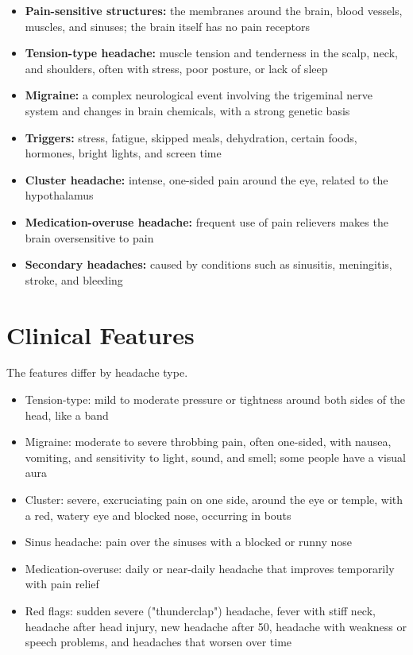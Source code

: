 \begin{itemize}
    \item \textbf{Pain-sensitive structures:} the membranes around the brain, blood vessels, muscles, and sinuses; the brain itself has no pain receptors
    \item \textbf{Tension-type headache:} muscle tension and tenderness in the scalp, neck, and shoulders, often with stress, poor posture, or lack of sleep
    \item \textbf{Migraine:} a complex neurological event involving the trigeminal nerve system and changes in brain chemicals, with a strong genetic basis
    \item \textbf{Triggers:} stress, fatigue, skipped meals, dehydration, certain foods, hormones, bright lights, and screen time
    \item \textbf{Cluster headache:} intense, one-sided pain around the eye, related to the hypothalamus
    \item \textbf{Medication-overuse headache:} frequent use of pain relievers makes the brain oversensitive to pain
    \item \textbf{Secondary headaches:} caused by conditions such as sinusitis, meningitis, stroke, and bleeding
\end{itemize}

\section*{Clinical Features}
The features differ by headache type.

\begin{itemize}
    \item Tension-type: mild to moderate pressure or tightness around both sides of the head, like a band
    \item Migraine: moderate to severe throbbing pain, often one-sided, with nausea, vomiting, and sensitivity to light, sound, and smell; some people have a visual aura
    \item Cluster: severe, excruciating pain on one side, around the eye or temple, with a red, watery eye and blocked nose, occurring in bouts
    \item Sinus headache: pain over the sinuses with a blocked or runny nose
    \item Medication-overuse: daily or near-daily headache that improves temporarily with pain relief
    \item Red flags: sudden severe ("thunderclap") headache, fever with stiff neck, headache after head injury, new headache after 50, headache with weakness or speech problems, and headaches that worsen over time
\end{itemize}

